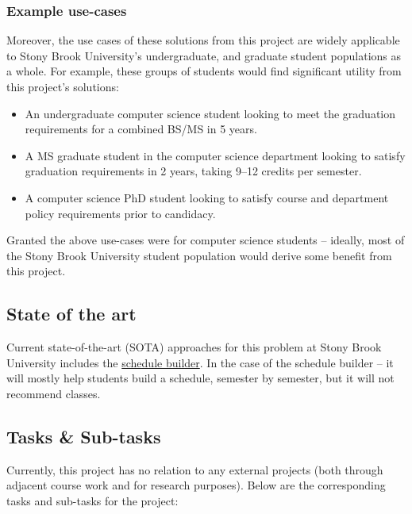 \documentclass[12pt]{article}
\begin{document}
    \subsubsection{Example use-cases}
    \label{subsubsec:example}
    Moreover, the use cases of these solutions from this project are widely applicable to Stony Brook University's undergraduate, and graduate student populations as a whole. For example, these groups of students would find significant utility from this project's solutions:
    \begin{itemize}
        \item An undergraduate computer science student looking to meet the graduation requirements for a combined BS/MS in 5 years.
        \item A MS graduate student in the computer science department looking to satisfy graduation requirements in 2 years, taking 9--12 credits per semester.
        \item A computer science PhD student looking to satisfy course and department policy requirements prior to candidacy.
    \end{itemize}

    Granted the above use-cases were for computer science students -- ideally, most of the Stony Brook University student population would derive some benefit from this project.

    \subsection{State of the art}
    \label{subsec:sota}
    Current state-of-the-art (SOTA) approaches for this problem at Stony Brook University includes the \href{https://you.stonybrook.edu/uaamedia/schedulebuilder/}{schedule builder}. In the case of the schedule builder -- it will mostly help students build a schedule, semester by semester\cite{sched}, but it will not recommend classes.

    \subsection{Tasks \& Sub-tasks}
    \label{subsec:tasks}
    Currently, this project has no relation to any external projects (both through adjacent course work and for research purposes). Below are the corresponding tasks and sub-tasks for the project:
\end{document}
